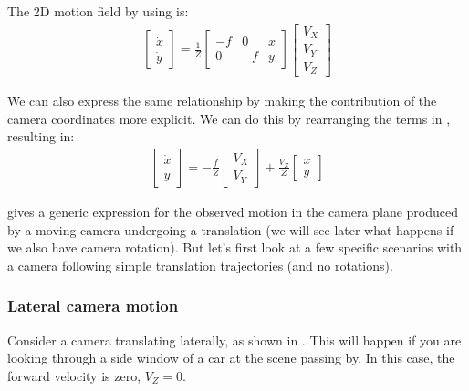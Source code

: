 The 2D motion field by using \eqn{\ref{eq:motionprojection}} is:
\begin{align}
    \begin{bmatrix}
        \dot{x} \\
        \dot{y}
    \end{bmatrix}
    = \frac{1}{Z}
    \begin{bmatrix}
        -f & 0  & x \\
        0  & -f & y
    \end{bmatrix}
    \begin{bmatrix}
        V_X \\
        V_Y \\
        V_Z
    \end{bmatrix}
    \label{eq:2d_motion_field_equation}
\end{align}

We can also express the same relationship by making the contribution of the camera coordinates more explicit. We can do this by rearranging the terms in \eqn{\ref{eq:2d_motion_field_equation}}, resulting in:
\begin{align}
    \begin{bmatrix}
        \dot{x} \\
        \dot{y}
    \end{bmatrix}
    = -\frac{f}{Z}
    \begin{bmatrix}
        V_X \\
        V_Y
    \end{bmatrix}
    +
    \frac{V_Z}{Z}
    \begin{bmatrix}
        x \\
        y
    \end{bmatrix}
\end{align}

\Eqn{\ref{eq:2d_motion_field_equation}} gives a generic expression for the observed motion in the camera plane produced by a moving camera undergoing a translation (we will see later what happens if we also have camera rotation). But let's first look at a few specific scenarios with a camera following simple translation trajectories (and no rotations).

\subsubsection{Lateral camera motion}
Consider a camera translating laterally, as shown in \fig{\ref{fig:camera_lateral_translation}}. This will happen if you are looking through a side window of a car at the scene passing by. In this case, the forward velocity is zero, $V_Z=0$.

